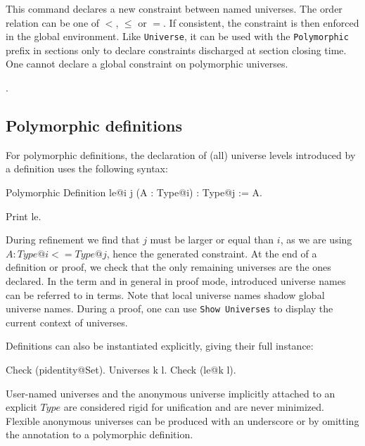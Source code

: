 This command declares a new constraint between named universes.
The order relation can be one of $<$, $\le$ or $=$. If consistent, 
the constraint is then enforced in the global environment. Like
\texttt{Universe}, it can be used with the \texttt{Polymorphic} prefix
in sections only to declare constraints discharged at section closing time.
One cannot declare a global constraint on polymorphic universes.

\begin{ErrMsgs}
\item {}.
\item {}
\end{ErrMsgs}

\subsection{Polymorphic definitions}
For polymorphic definitions, the declaration of (all) universe levels
introduced by a definition uses the following syntax:

\begin{coq_example*}
Polymorphic Definition le@{i j} (A : Type@{i}) : Type@{j} := A.
\end{coq_example*}
\begin{coq_example}
Print le.
\end{coq_example}

During refinement we find that $j$ must be larger or equal than $i$, as
we are using $A : Type@{i} <= Type@{j}$, hence the generated
constraint. At the end of a definition or proof, we check that the only
remaining universes are the ones declared. In the term and in general in
proof mode, introduced universe names can be referred to in
terms. Note that local universe names shadow global universe names.
During a proof, one can use \texttt{Show Universes} to display
the current context of universes.

Definitions can also be instantiated explicitly, giving their full instance:
\begin{coq_example}
Check (pidentity@{Set}).
Universes k l.
Check (le@{k l}).
\end{coq_example}

User-named universes and the anonymous universe implicitly attached to
an explicit $Type$ are considered rigid for unification and are never
minimized. Flexible anonymous universes can be produced with an
underscore or by omitting the annotation to a polymorphic definition.


